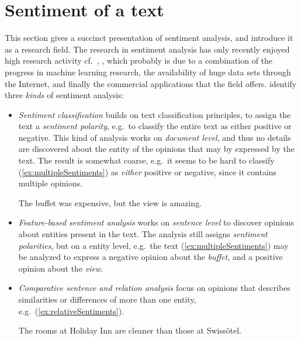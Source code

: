 \section{Sentiment of a text}
This section gives a succinct presentation of sentiment analysis, and introduce it as a research field. The research in sentiment analysis has only recently enjoyed high research activity cf.\ \cite{webDataMining}, \cite{omsa}, which probably is due to a combination of the progress in machine learning research, the availability of huge data sets through the Internet, and finally the commercial applications that the field offers. \citeauthor{webDataMining}  identify three \emph{kinds} of sentiment analysis:
\begin{itemize}
	\item \emph{Sentiment classification} builds on text classification principles, to assign the text a \emph{sentiment polarity}, e.g.\ to classify the entire text as either positive or negative. This kind of analysis works on \emph{document level}, and thus no details are discovered about the entity of the opinions that may by expressed by the text. The result is somewhat coarse, e.g.\ it  seems to be hard to classify (\ref{ex:multipleSentiments}) as \emph{either} positive or negative, since it contains multiple opinions.
	\vspace{1em}
	\begin{numquote}
		The buffet was expensive, but the view is amazing.
		\label{ex:multipleSentiments}
	\end{numquote}
	\item \emph{Feature-based sentiment analysis} works on \emph{sentence level} to discover opinions about entities present in the text. The analysis still assigns \emph{sentiment polarities}, but on a entity level, e.g.\ the text (\ref{ex:multipleSentiments}) may be analyzed to express a negative opinion about the \emph{buffet}, and a positive opinion about the \emph{view}.
	\item \emph{Comparative sentence and relation analysis} focus on opinions that describes similarities or differences of more than one entity, e.g.\ (\ref{ex:relativeSentiments}).
	\vspace{1em}
	\begin{numquote1}
		The rooms at Holiday Inn are cleaner than those at Swissôtel.		
		\label{ex:relativeSentiments}		
	\end{numquote1}	
\end{itemize}


